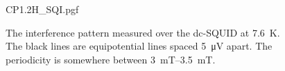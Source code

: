 \begin{figure}[h]
	\centering
	{CP1.2H_SQI.pgf}
	\caption{The interference pattern measured over the dc-SQUID at \qty{7.6}{\kelvin}. The black lines are equipotential lines spaced \qty{5}{\micro\volt} apart. The periodicity is somewhere between \qtyrange{3}{3.5}{\milli\tesla}.}
\end{figure}


